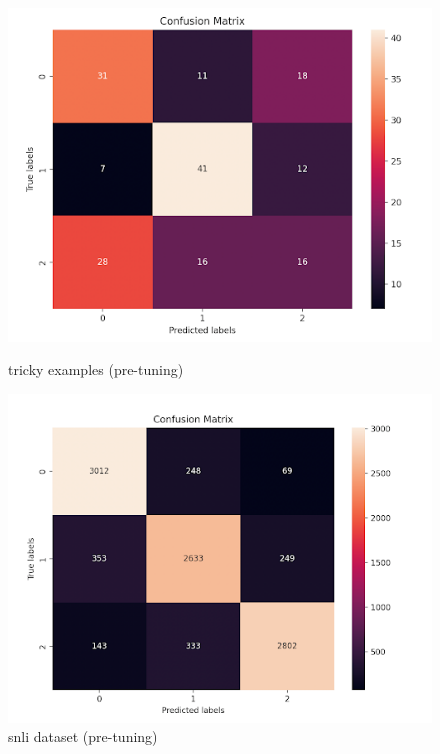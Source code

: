 \documentclass{article}
\begin{document}
\begin{figure}[!h]
  \centering
  \begin{minipage}{0.46\textwidth}
    \includegraphics[width=\linewidth]{images/confusion_trained_tricky.png}
    \caption{tricky examples (pre-tuning)}
    \label{fig:b}
  \end{minipage}
  \hfill
  \begin{minipage}{0.48\textwidth}
    \includegraphics[width=\linewidth]{images/confusion_trained_snli.png}
    \caption{snli dataset (pre-tuning)}
    \label{fig:c}
  \end{minipage}
\end{figure}
\end{document}
